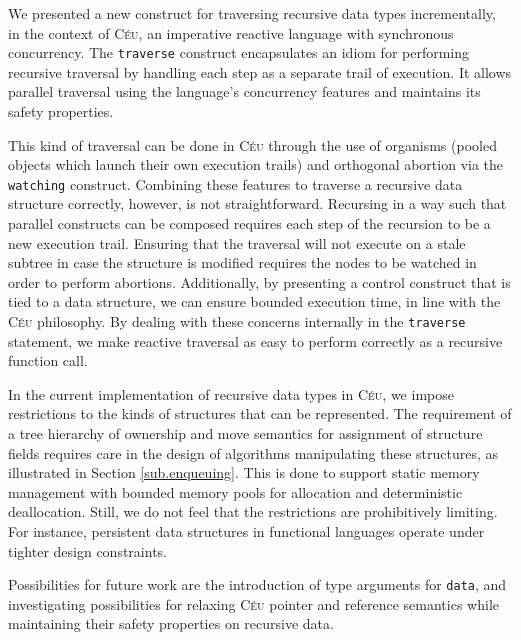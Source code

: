 \documentclass{sig-alternate}
\newcommand{\CEU}{\textsc{C\'{e}u}\xspace}
\newcommand{\code}[1] {{\small{\texttt{#1}}}}
\begin{document}
We presented a new construct for traversing recursive data types
incrementally, in the context of \CEU, an imperative reactive language with
synchronous concurrency. The \code{traverse} construct encapsulates an idiom
for performing recursive traversal by handling each step as a separate trail
of execution. It allows parallel traversal using the language's concurrency
features and maintains its safety properties.

This kind of traversal can be done in \CEU through the use of organisms
(pooled objects which launch their own execution trails) and orthogonal
abortion via the \code{watching} construct. Combining these features to
traverse a recursive data structure correctly, however, is not straightforward.
Recursing in a way such that parallel constructs can be composed requires each
step of the recursion to be a new execution trail. Ensuring that the traversal
will not execute on a stale subtree in case the structure is modified requires
the nodes to be watched in order to perform abortions. Additionally, by
presenting a control construct that is tied to a data structure, we can ensure
bounded execution time, in line with the \CEU philosophy. By dealing with these
concerns internally in the \code{traverse} statement, we make reactive
traversal as easy to perform correctly as a recursive function call.

In the current implementation of recursive data types in \CEU, we impose
restrictions to the kinds of structures that can be represented. The
requirement of a tree hierarchy of ownership and move semantics for assignment
of structure fields requires care in the design of algorithms
manipulating these structures, as illustrated in Section \ref{sub.enqueuing}.
This is done to support static memory management with bounded memory pools for
allocation and deterministic deallocation. Still, we do not feel that the
restrictions are prohibitively limiting. For instance, persistent data
structures in functional languages \cite{okasaki.purely} operate under tighter design constraints.

Possibilities for future work are the introduction of type arguments for \code{data},
and investigating possibilities for relaxing \CEU pointer and
reference semantics while maintaining their safety properties on recursive data.

\balance



\balancecolumns
\end{document}

